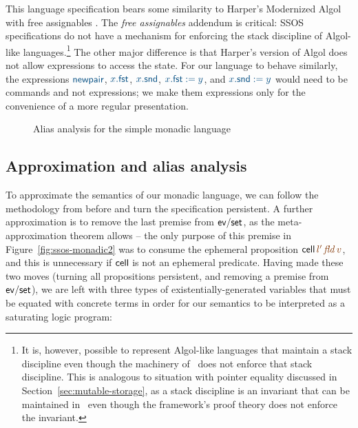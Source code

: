 This language specification bears some similarity to Harper's
Modernized Algol with free assignables \cite[Chapter
36]{harper12practical}. The {\it free assignables} addendum is
critical: SSOS specifications do not have a mechanism for enforcing
the stack discipline of Algol-like languages.\footnote{It is, however,
  possible to represent Algol-like languages that maintain a stack
  discipline even though the machinery of \sls~does not enforce that
  stack discipline. This is analogous to situation with pointer
  equality discussed in Section~\ref{sec:mutable-storage}, as a stack
  discipline is an invariant that can be maintained in \sls~even
  though the framework's proof theory does not enforce the invariant.}
The other major difference is that Harper's version of Algol does not
allow expressions to access the state.  For our language to behave
similarly, the expressions $\obj{\sf newpair}$, $\obj{x.{\sf fst}}$,
$\obj{x.{\sf snd}}$, $\obj{x.{\sf fst} := y}$, and $\obj{x.{\sf snd}
  := y}$ would need to be commands and not expressions; we make them
expressions only for the convenience of a more regular presentation.

\begin{figure}
\caption{Alias analysis for the simple monadic language}
\label{fig:ssos-monadic-approx}
\end{figure}



\subsection{Approximation and alias analysis}


To approximate the semantics of our monadic language, we can follow the
methodology from before and turn the specification persistent. A further
approximation is to remove the last premise from ${\sf ev/set}$, as
the meta-approximation theorem allows -- the only purpose of this
premise in Figure~\ref{fig:ssos-monadic2} was to consume the ephemeral
proposition ${\sf cell}\,\lf{l'}\,\lf{\it fld}\,\lf{v}$, and this is unnecessary
if ${\sf cell}$ is not an ephemeral predicate.  Having
made these two moves (turning all propositions persistent, and removing
a premise from ${\sf ev/set}$), we are left with three types of
existentially-generated variables that must be equated with concrete
terms in order for our semantics to be interpreted as a saturating
logic program:

